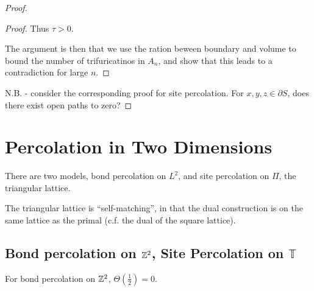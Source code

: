 \begin{proof}
\begin{proof}
    Thus $\tau > 0$.

    The argument is then that we use the ration beween boundary and
    volume to bound the number of trifuricatinos in $A_n$, and show
    that this leads to a contradiction for large $n$.
  \end{proof}
  


  N.B. - consider the corresponding proof for site percolation.  For
  $x, y, z \in \partial S$, does there exist open paths to zero?
\end{proof}

\section{Percolation in Two Dimensions}
\label{sec:perc-two-dimens}

There are two models, bond percolation on $L^{2}$, and site
percolation on $\Pi$, the triangular lattice.

The triangular lattice is ``self-matching'', in that the dual
construction is  on the same lattice as the primal (c.f. the dual of
the square lattice).

\subsection{Bond percolation on $\mathbb{Z}^2$, Site Percolation on $\mathbb{T}$}
\label{sec:bond-percolation-z2}

\begin{thm}
  \label{defn:random_walks_on_graphs:26}
  For bond percolation on $\mathbb{Z}^{2}$, $\Theta(\frac{1}{2}) = 0$.
\end{thm}

